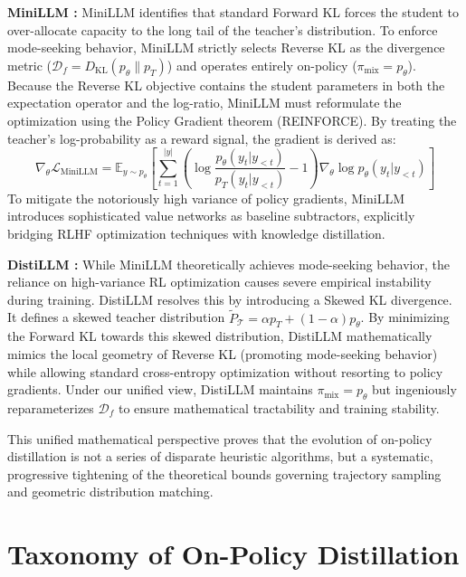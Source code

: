 \documentclass{article} %
\newcommand{\ptheta}{p_\theta}
\newcommand{\pteacher}{p_T}
\newcommand{\loss}{\mathcal{L}}
\begin{document}
\textbf{MiniLLM \citep{2306.08543}:} MiniLLM identifies that standard Forward KL forces the student to over-allocate capacity to the long tail of the teacher's distribution. To enforce mode-seeking behavior, MiniLLM strictly selects Reverse KL as the divergence metric ($\mathcal{D}_f = D_{\mathrm{KL}}(\ptheta \parallel \pteacher)$) and operates entirely on-policy ($\pi_{\mathrm{mix}} = \ptheta$). Because the Reverse KL objective contains the student parameters in both the expectation operator and the log-ratio, MiniLLM must reformulate the optimization using the Policy Gradient theorem (REINFORCE). By treating the teacher's log-probability as a reward signal, the gradient is derived as:
\begin{equation}
    \nabla_\theta \loss_{\mathrm{MiniLLM}} = \mathbb{E}_{y \sim \ptheta} \left[ \sum_{t=1}^{|y|} \left( \log \frac{\ptheta(y_t|y_{<t})}{\pteacher(y_t|y_{<t})} - 1 \right) \nabla_\theta \log \ptheta(y_t|y_{<t}) \right]
\end{equation}
To mitigate the notoriously high variance of policy gradients, MiniLLM introduces sophisticated value networks as baseline subtractors, explicitly bridging RLHF optimization techniques with knowledge distillation.

\textbf{DistiLLM \citep{2402.03898}:} While MiniLLM theoretically achieves mode-seeking behavior, the reliance on high-variance RL optimization causes severe empirical instability during training. DistiLLM resolves this by introducing a Skewed KL divergence. It defines a skewed teacher distribution $\tilde{P}_{\mathcal{T}} = \alpha \pteacher + (1-\alpha) \ptheta$. By minimizing the Forward KL towards this skewed distribution, DistiLLM mathematically mimics the local geometry of Reverse KL (promoting mode-seeking behavior) while allowing standard cross-entropy optimization without resorting to policy gradients. Under our unified view, DistiLLM maintains $\pi_{\mathrm{mix}} = \ptheta$ but ingeniously reparameterizes $\mathcal{D}_f$ to ensure mathematical tractability and training stability.

This unified mathematical perspective proves that the evolution of on-policy distillation is not a series of disparate heuristic algorithms, but a systematic, progressive tightening of the theoretical bounds governing trajectory sampling and geometric distribution matching.


\section{Taxonomy of On-Policy Distillation}
\label{sec:taxonomy}
\end{document}

